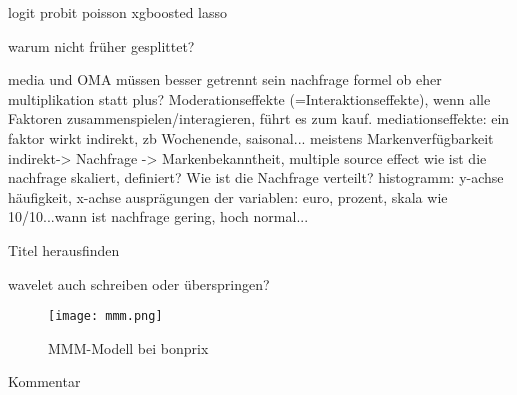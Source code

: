 logit
probit
poisson
xgboosted
lasso

warum nicht früher gesplittet?

media und OMA müssen besser getrennt sein
nachfrage formel ob eher multiplikation statt plus? Moderationseffekte (=Interaktionseffekte), wenn alle Faktoren zusammenspielen/interagieren, führt es zum kauf.
mediationseffekte: ein faktor wirkt indirekt, zb Wochenende, saisonal... meistens Markenverfügbarkeit indirekt-> Nachfrage -> Markenbekanntheit, 
multiple source effect 
wie ist die nachfrage skaliert, definiert? Wie ist die Nachfrage verteilt?
histogramm: y-achse häufigkeit, x-achse ausprägungen der variablen: euro, prozent, skala wie 10/10...wann ist nachfrage gering, hoch normal...

Titel herausfinden

wavelet auch schreiben oder überspringen?


\begin{figure} [h]
    \centering
    \texttt{[image: mmm.png]}
    \caption{\ac{MMM}-Modell bei bonprix}
    \label{fig:mmm-label}
\end{figure}


Kommentar 
\fi

